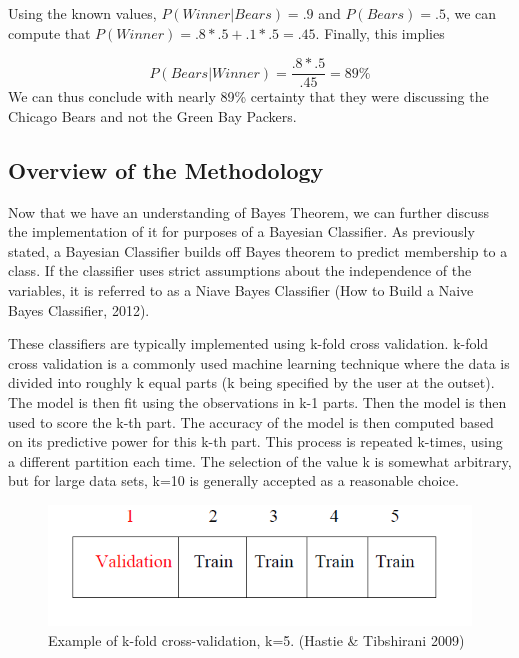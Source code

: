 \begin{flushleft}Using the known values, \begin{math}P(Winner|Bears)=.9\end{math} and \begin{math}P(Bears)=.5\end{math}, we can compute that \begin{math}P(Winner)=.8*.5+.1*.5=.45\end{math}. Finally, this implies
\end{flushleft}
\begin{equation}
P(Bears|Winner)=\frac{.8*.5}{.45}=89\%
\end{equation}
We can thus conclude with nearly 89\% certainty that they were discussing the Chicago Bears and not the Green Bay Packers.



\subsection{Overview of the Methodology} %

\begin{flushleft}
Now that we have an understanding of Bayes Theorem, we can further discuss the implementation of it for purposes of a Bayesian Classifier. As previously stated, a Bayesian Classifier builds off Bayes theorem to predict membership to a class. If the classifier uses strict assumptions about the independence of the variables, it is referred to as a Niave Bayes Classifier (How to Build a Naive Bayes Classifier, 2012). 
\end{flushleft}
These classifiers are typically implemented using k-fold cross validation. k-fold cross validation is a commonly used machine learning technique where the data is divided into roughly k equal parts (k being specified by the user at the outset). The model is then fit using the observations in k-1 parts. Then the model is then used to score the k-th part. The accuracy of the model is then computed based on its predictive power for this k-th part. This process is repeated k-times, using a different partition each time. The selection of the value k is somewhat arbitrary, but for large data sets, k=10 is generally accepted as a reasonable choice. 

\begin{figure}[H]
    \centering
       \includegraphics[width=4.5 in]{k-fold_cv.png}
    \caption{Example of k-fold cross-validation, k=5. (Hastie \& Tibshirani 2009)}
    \label{Example Data}
\end{figure}


